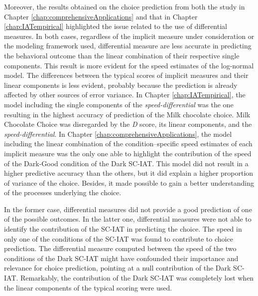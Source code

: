 \documentclass[12pt]{book}
\begin{document}
Moreover, the results obtained on the choice prediction from both the study in Chapter \ref{chap:comprehensiveApplications} and that in Chapter \ref{chap:IATempirical} highlighted the issue related to the use of differential measures.
In both cases, regardless of the implicit measure under consideration or the modeling framework used, differential measure are less accurate in predicting the behavioral outcome than the linear combination of their respective single components. 
This result is more evident for the speed estimates of the log-normal model. The differences between the typical scores of implicit measures and their linear components is less evident, probably because the prediction is already affected by other sources of error variance.
In Chapter \ref{chap:IATempirical}, the model including the single components of the \emph{speed-differential} was the one resulting in the highest accuracy of prediction of the Milk chocolate choice. Milk Chocolate Choice was disregarded by the \emph{D} score, its linear components, and the \emph{speed-differential}. 
In Chapter \ref{chap:comprehensiveApplications}, the model including the linear combination of the condition--specific speed estimates of each implicit measure was the only one able to highlight the contribution of the speed of the Dark-Good condition of the Dark SC-IAT.
This model did not result in a higher predictive accuracy than the others, but it did explain a higher proportion of variance of the choice. 
Besides, it made possible to gain a better understanding of the processes underlying the choice. 

In the former case, differential measures did not provide a good prediction of one of the possible outcomes. 
In the latter one, differential measures were not able to identify the contribution of the SC-IAT in predicting the choice. 
The speed in only one of the conditions of the SC-IAT was found to contribute to choice prediction. 
The differential measure computed between the speed of the two conditions of the Dark SC-IAT might have confounded their importance and relevance for choice prediction, pointing at a null contribution of the Dark SC-IAT. 
Remarkably, the contribution of the Dark SC-IAT was completely lost when the linear components of the typical scoring were used. 
\end{document}
